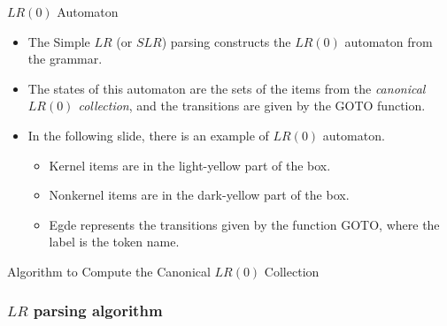 \begin{bibunit}[apalike]
\begin{frame}{$LR(0)$ Automaton}
	\begin{itemize}
	\item The Simple $LR$ (or $SLR$) parsing constructs the $LR(0)$ automaton from the grammar.
	\item The states of this automaton are the sets of the items from the \emph{canonical $LR(0)$ collection}, and the transitions are given by the GOTO function.
	\vfill
	\item In the following slide, there is an example of $LR(0)$ automaton.
		\begin{itemize}
		\item Kernel items are in the light-yellow part of the box.
		\item Nonkernel items are in the dark-yellow part of the box.
		\item Egde represents the transitions given by the function GOTO, where the label is the token name.
		\end{itemize}
	\end{itemize}
\end{frame}


\begin{frame}{Algorithm to Compute the Canonical $LR(0)$ Collection}
	\begin{scriptsize}
	\begin{myalgorithm}
	\end{myalgorithm}
	\end{scriptsize}
\end{frame}

\subsubsection{$LR$ parsing algorithm}

\tableofcontentslide[sectionstyle={show/shaded},subsectionstyle={show/shaded/hide},subsubsectionstyle={show/shaded/hide/hide}]



\end{bibunit}
